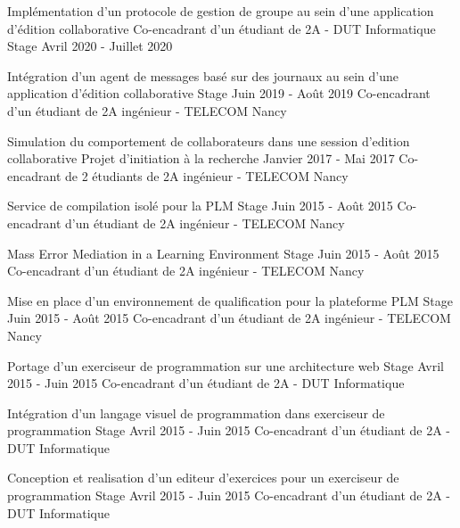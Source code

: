 \documentclass[12pt, a4paper]{awesome-cv}
\begin{document}
\begin{cventries}

  \cventry
    {Implémentation d'un protocole de gestion de groupe au sein d'une application d'édition collaborative} %
    {Co-encadrant d'un étudiant de 2A - DUT Informatique} %
    {Stage} %
    {Avril 2020 - Juillet 2020} %
    {}

  \medskip

  \cventry
    {Intégration d'un agent de messages basé sur des journaux au sein d'une application d'édition collaborative} %
    {Stage} %
    {} %
    {Juin 2019 - Août 2019} %
    {Co-encadrant d'un étudiant de 2A ingénieur - TELECOM Nancy}

  \medskip

  \cventry
    {Simulation du comportement de collaborateurs dans une session d’edition collaborative} %
    {Projet d'initiation à la recherche} %
    {} %
    {Janvier 2017 - Mai 2017} %
    {Co-encadrant de 2 étudiants de 2A ingénieur - TELECOM Nancy}

  \medskip

  \cventry
    {Service de compilation isolé pour la PLM} %
    {Stage} %
    {} %
    {Juin 2015 - Août 2015} %
    {Co-encadrant d'un étudiant de 2A ingénieur - TELECOM Nancy}

    \medskip

  \cventry
    {Mass Error Mediation in a Learning Environment} %
    {Stage} %
    {} %
    {Juin 2015 - Août 2015} %
    {Co-encadrant d'un étudiant de 2A ingénieur - TELECOM Nancy}

  \medskip

  \cventry
    {Mise en place d'un environnement de qualification pour la plateforme PLM} %
    {Stage} %
    {} %
    {Juin 2015 - Août 2015} %
    {Co-encadrant d'un étudiant de 2A ingénieur - TELECOM Nancy}

  \medskip

  \cventry
    {Portage d’un exerciseur de programmation sur une architecture web} %
    {Stage} %
    {} %
    {Avril 2015 - Juin 2015} %
    {Co-encadrant d'un étudiant de 2A - DUT Informatique}

  \medskip

  \cventry
    {Intégration d’un langage visuel de programmation dans exerciseur de programmation} %
    {Stage} %
    {} %
    {Avril 2015 - Juin 2015} %
    {Co-encadrant d'un étudiant de 2A - DUT Informatique}

  \medskip

  \cventry
    {Conception et realisation d’un editeur d’exercices pour un exerciseur de programmation} %
    {Stage} %
    {} %
    {Avril 2015 - Juin 2015} %
    {Co-encadrant d'un étudiant de 2A - DUT Informatique}
\end{cventries}

\end{document}
